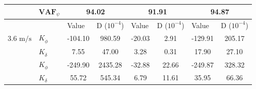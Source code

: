 \begin{table}[]
\begin{tabular}{llcccccc}
                                    & $\mathbf{VAF}_\psi$   & \multicolumn{2}{c}{94.02}                                                                       & \multicolumn{2}{c}{91.91}                                                                       & \multicolumn{2}{c}{94.87}                                                                       \\ \hline
                                    &                       & \multicolumn{1}{l}{\multirow{2}{*}{Value}} & \multicolumn{1}{l}{\multirow{2}{*}{D ($10^{-4}$)}} & \multicolumn{1}{l}{\multirow{2}{*}{Value}} & \multicolumn{1}{l}{\multirow{2}{*}{D ($10^{-4}$)}} & \multicolumn{1}{l}{\multirow{2}{*}{Value}} & \multicolumn{1}{l}{\multirow{2}{*}{D ($10^{-4}$)}} \\
                                    &                       & \multicolumn{1}{l}{}                       & \multicolumn{1}{l}{}                               & \multicolumn{1}{l}{}                       & \multicolumn{1}{l}{}                               & \multicolumn{1}{l}{}                       & \multicolumn{1}{l}{}                               \\ \cline{3-8} 
    3.6 $\si{\meter\per\second}$ & $K_{\dot{\phi}} $     & -104.10                                    & 980.59                                             & -20.03                                     & 2.91                                               & -129.91                                    & 205.17                                             \\
                                    & $K_{\dot{\delta}}$    & 7.55                                       & 47.00                                              & 3.28                                       & 0.31                                               & 17.90                                      & 27.10                                              \\
                                    & $K_{\phi} $           & -249.90                                    & 2435.28                                            & -32.88                                     & 22.66                                              & -249.87                                    & 328.32                                             \\
                                    & $K_\delta $           & 55.72                                      & 545.34                                             & 6.79                                       & 11.61                                              & 35.95                                      & 66.36                                              \\

\end{tabular}
\end{table}
